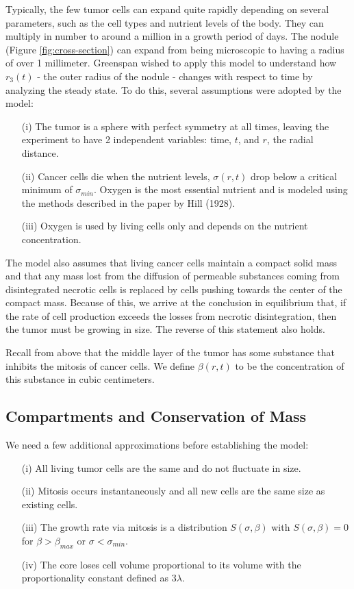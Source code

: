 \documentclass{article}
\begin{document}
Typically, the few tumor cells can expand quite rapidly depending on several parameters, such as the cell types and nutrient levels of the body.
They can multiply in number to around a million in a growth period of days. The nodule (Figure \ref{fig:cross-section}) can expand from being microscopic
to having a radius of over 1 millimeter. Greenspan wished to apply this model to understand how $r_3(t)$ - the outer radius of the nodule - changes
with respect to time by analyzing the steady state. To do this, several assumptions were adopted by the model:

\begin{enumerate}
    \item[(i)] The tumor is a sphere with perfect symmetry at all times, leaving the experiment to have 2 independent variables: time, $t$, and $r$, the radial distance.
    \item[(ii)] Cancer cells die when the nutrient levels, $\sigma(r, t)$ drop below a critical minimum of $\sigma_{min}.$ Oxygen is the most essential nutrient and is modeled using the methods described in the paper by Hill (1928).
    \item[(iii)] Oxygen is used by living cells only and depends on the nutrient concentration.
\end{enumerate}

The model also assumes that living cancer cells maintain a compact solid mass and that any mass lost from the diffusion of permeable substances coming from
disintegrated necrotic cells is replaced by cells pushing towards the center of the compact mass. Because of this, we arrive at the conclusion in equilibrium that,
if the rate of cell production exceeds the losses from necrotic disintegration, then the tumor must be growing in size. The reverse of this statement also holds.

Recall from above that the middle layer of the tumor has some substance that inhibits the mitosis of cancer cells. We define $\beta(r, t)$ to be the concentration
of this substance in cubic centimeters.

\subsection{Compartments and Conservation of Mass}

We need a few additional approximations before establishing the model:

\begin{enumerate}
    \item[(i)] All living tumor cells are the same and do not fluctuate in size.
    \item[(ii)] Mitosis occurs instantaneously and all new cells are the same size as existing cells.
    \item[(iii)] The growth rate via mitosis is a distribution $S(\sigma, \beta)$ with $S(\sigma, \beta) = 0$ for $\beta > \beta_{max}$ or $\sigma < \sigma_{min}$.
    \item[(iv)] The core loses cell volume proportional to its volume with the proportionality constant defined as $3\lambda$.
\end{enumerate}
\end{document}
